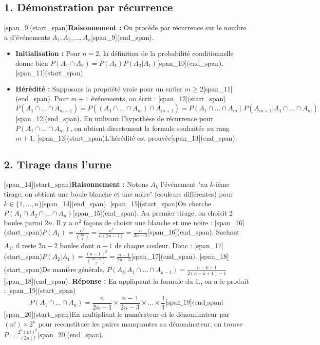 \documentclass[11pt,a4paper]{article}
\begin{document}
\subsection*{1. Démonstration par récurrence}
[span_9](start_span)\textbf{Raisonnement :} On procède par récurrence sur le nombre $n$ d'événements $A_1, A_2, \dots, A_n$[span_9](end_span).
\begin{itemize}
    [span_10](start_span)\item \textbf{Initialisation :} Pour $n=2$, la définition de la probabilité conditionnelle donne bien $P(A_1 \cap A_2) = P(A_1)P(A_2|A_1)$[span_10](end_span).
    [span_11](start_span)\item \textbf{Hérédité :} Supposons la propriété vraie pour un entier $m \ge 2$[span_11](end_span). Pour $m+1$ événements, on écrit :
    [span_12](start_span)$P(A_1 \cap \dots \cap A_{m+1}) = P((A_1 \cap \dots \cap A_m) \cap A_{m+1}) = P(A_1 \cap \dots \cap A_m)P(A_{m+1} | A_1 \cap \dots \cap A_m)$[span_12](end_span).
    En utilisant l'hypothèse de récurrence pour $P(A_1 \cap \dots \cap A_m)$, on obtient directement la formule souhaitée au rang $m+1$. [span_13](start_span)L'hérédité est prouvée[span_13](end_span).
\end{itemize}

\subsection*{2. Tirage dans l'urne}
[span_14](start_span)\textbf{Raisonnement :} Notons $A_k$ l'événement "au $k$-ième tirage, on obtient une boule blanche et une noire" (couleurs différentes) pour $k \in \{1, \dots, n\}$[span_14](end_span).
[span_15](start_span)On cherche $P(A_1 \cap A_2 \cap \dots \cap A_n)$[span_15](end_span).
Au premier tirage, on choisit 2 boules parmi $2n$. Il y a $n^2$ façons de choisir une blanche et une noire :
[span_16](start_span)$P(A_1) = \frac{n^2}{\binom{2n}{2}} = \frac{n^2}{n(2n-1)} = \frac{n}{2n-1}$[span_16](end_span).
Sachant $A_1$, il reste $2n-2$ boules dont $n-1$ de chaque couleur. Donc :
[span_17](start_span)$P(A_2|A_1) = \frac{(n-1)^2}{\binom{2n-2}{2}} = \frac{n-1}{2n-3}$[span_17](end_span).
[span_18](start_span)De manière générale, $P(A_k | A_1 \cap \dots \cap A_{k-1}) = \frac{n-k+1}{2(n-k+1)-1}$[span_18](end_span).
\textbf{Réponse :} En appliquant la formule du 1., on a le produit :
[span_19](start_span)$$P(A_1 \cap \dots \cap A_n) = \frac{n}{2n-1} \times \frac{n-1}{2n-3} \times \dots \times \frac{1}{1} \text{[span_19](end_span)}$$
[span_20](start_span)En multipliant le numérateur et le dénominateur par $(n!) \times 2^n$ pour reconstituer les paires manquantes au dénominateur, on trouve $P = \frac{2^n(n!)^2}{(2n)!}$[span_20](end_span).
\end{document}
